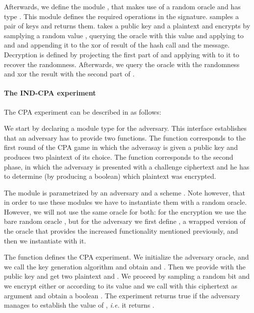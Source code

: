Afterwards, we define the module , that makes use of a random
oracle  and has type . This module defines the
required operations in the  signature.  samples a
pair of keys and returns them.  takes a public key  and
a plaintext  and encrypts by samplying a random value ,
querying the oracle with this value and applying  to  and
 and appending it to the xor of result of the hash call and the
message. Decryption is defined by projecting the first part of 
and applying  with  to it to recover the
randomness. Afterwards, we query the oracle with the randomness and
xor the result with the second part of .

\paragraph{The \textsf{IND-CPA} experiment}
The CPA experiment can be described in \EC as follows:


We start by declaring a module type for the adversary. This interface
establishes that an adversary has to provide two functions. The
function  corresponds to the first round of the CPA game in
which the adverasay is given a public key  and produces two
plaintext of its choice. The function  corresponds to the
second phase, in which the adversary is presented with a challenge
ciphertext  and he has to determine (by producing a boolean)
which plaintext was encrypted.

The module  is parametrized by an adversary  and a
scheme . Note however, that in order to use these modules we
have to instantiate them with a random oracle. However, we will not
use the same oracle for both: for the encryption we use the bare
random oracle , but for the adversary we first define ,
a wrapped version of the oracle that provides the increased
functionality mentioned previously, and then we instantiate 
with it.

The function  defines the CPA experiment. We initialize the
adversary oracle, and we call the key generation algorithm and obtain
 and . Then we provide  with the public key and get
two plaintext  and . We proceed by sampling a random bit
and we encrypt either  or  according to its value and we
call  with this ciphertext as argument and obtain a boolean
. The experiment returns true if the adversary manages to
establish the value of , {\em i.e.} it returns .

